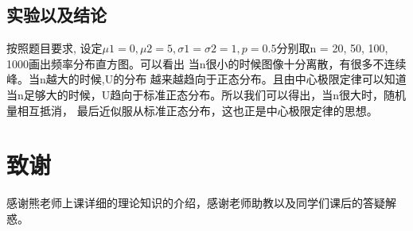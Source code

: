 \documentclass{ctexart}
\begin{document}
    \subsection{实验以及结论}
    按照题目要求, 设定$\mu{1}=0,\mu2=5,\sigma{1}=\sigma{2}=1,p=0.5$分别取n = 20, 50, 100, 1000画出频率分布直方图。可以看出
    当n很小的时候图像十分离散，有很多不连续峰。当n越大的时候,U的分布
    越来越趋向于正态分布。且由中心极限定律可以知道当n足够大的时候，U趋向于标准正态分布。所以我们可以得出，当n很大时，随机量相互抵消，
    最后近似服从标准正态分布，这也正是中心极限定律的思想。
    \begin{figure}[htbp]
  \centering


\end{figure}
\section{致谢}
  感谢熊老师上课详细的理论知识的介绍，感谢老师助教以及同学们课后的答疑解惑。 

  
    
\end{document}
